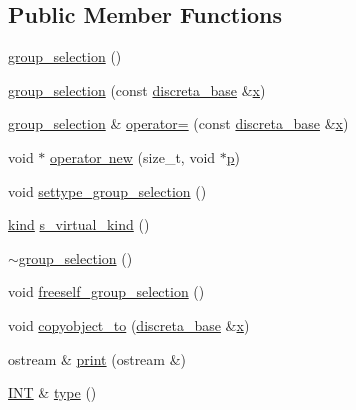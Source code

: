 \subsection*{Public Member Functions}
\begin{DoxyCompactItemize}
\item 
\mbox{\hyperlink{classgroup__selection_a2becdd8a6d93195ff4faa1e0df6f9eae}{group\+\_\+selection}} ()
\item 
\mbox{\hyperlink{classgroup__selection_a8c1d31e033e97292bd58fd64b5353322}{group\+\_\+selection}} (const \mbox{\hyperlink{classdiscreta__base}{discreta\+\_\+base}} \&\mbox{\hyperlink{alphabet2_8_c_a6150e0515f7202e2fb518f7206ed97dc}{x}})
\item 
\mbox{\hyperlink{classgroup__selection}{group\+\_\+selection}} \& \mbox{\hyperlink{classgroup__selection_abf861ab6bf4c061dd36775301c1e4f46}{operator=}} (const \mbox{\hyperlink{classdiscreta__base}{discreta\+\_\+base}} \&\mbox{\hyperlink{alphabet2_8_c_a6150e0515f7202e2fb518f7206ed97dc}{x}})
\item 
void $\ast$ \mbox{\hyperlink{classgroup__selection_af99b3b7ee09ea8e09f7be9cf080c74d3}{operator new}} (size\+\_\+t, void $\ast$\mbox{\hyperlink{alphabet2_8_c_a533391314665d6bf1b5575e9a9cd8552}{p}})
\item 
void \mbox{\hyperlink{classgroup__selection_a015ed73b7b8d784bedd4d11ac1fc0ec1}{settype\+\_\+group\+\_\+selection}} ()
\item 
\mbox{\hyperlink{discreta_8h_aaf25ee7e2306d78c74ec7bc48f092e81}{kind}} \mbox{\hyperlink{classgroup__selection_a21d7be997a2787d8a1284696b01038e8}{s\+\_\+virtual\+\_\+kind}} ()
\item 
\mbox{\hyperlink{classgroup__selection_a3e5fde933dbf37ec41568956f3edf026}{$\sim$group\+\_\+selection}} ()
\item 
void \mbox{\hyperlink{classgroup__selection_a778b1a466858bf7f90516eeba1795798}{freeself\+\_\+group\+\_\+selection}} ()
\item 
void \mbox{\hyperlink{classgroup__selection_a02a5e69978de662af0e8372a4f0b23a8}{copyobject\+\_\+to}} (\mbox{\hyperlink{classdiscreta__base}{discreta\+\_\+base}} \&\mbox{\hyperlink{alphabet2_8_c_a6150e0515f7202e2fb518f7206ed97dc}{x}})
\item 
ostream \& \mbox{\hyperlink{classgroup__selection_a522bc3a2346d1031fbb82f5a4d0b29cc}{print}} (ostream \&)
\item 
\mbox{\hyperlink{galois_8h_a09fddde158a3a20bd2dcadb609de11dc}{I\+NT}} \& \mbox{\hyperlink{classgroup__selection_a7d7efa588eae53bc12ab0cc6a45fad31}{type}} ()

\end{DoxyCompactItemize}

